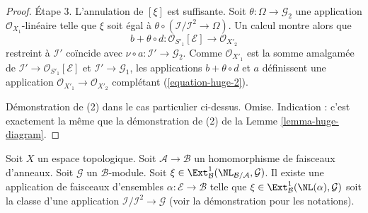 \begin{proof}
\medskip\noindent
Étape 3. L'annulation de $[\xi]$ est suffisante. Soit
$\theta : \Omega \to \mathcal{G}_2$ une application
$\mathcal{O}_{X_1}$-linéaire telle que $\xi$ soit égal à
$\theta \circ (\mathcal{I}/\mathcal{I}^2 \to \Omega)$.
Un calcul montre alors que
$$
b + \theta \circ d : \mathcal{O}_{S'_1}[\mathcal{E}] \to \mathcal{O}_{X'_2}
$$
restreint à $\mathcal{I}'$ coïncide avec
$\nu \circ a : \mathcal{I}' \to \mathcal{G}_2$. Comme
$\mathcal{O}_{X'_1}$ est la somme amalgamée de
$\mathcal{I}' \to \mathcal{O}_{S'_1}[\mathcal{E}]$ et
$\mathcal{I}' \to \mathcal{G}_1$, les applications
$b + \theta \circ d$ et $a$ définissent une application
$\mathcal{O}_{X'_1} \to \mathcal{O}_{X'_2}$ complétant
(\ref{equation-huge-2}).

\medskip\noindent
Démonstration de (2) dans le cas particulier ci-dessus. Omise. Indication :
c'est exactement la même que la démonstration de (2) de la
Lemme \ref{lemma-huge-diagram}.
\end{proof}

\begin{lemma}
\label{lemma-NL-represent-ext-class}
Soit $X$ un espace topologique. Soit $\mathcal{A} \to \mathcal{B}$ un
homomorphisme de faisceaux d'anneaux. Soit $\mathcal{G}$ un
$\mathcal{B}$-module. Soit
$\xi \in \Ext^1_\mathcal{B}(\NL_{\mathcal{B}/\mathcal{A}}, \mathcal{G})$.
Il existe une application de faisceaux d'ensembles
$\alpha : \mathcal{E} \to \mathcal{B}$ telle que
$\xi \in \Ext^1_\mathcal{B}(\NL(\alpha), \mathcal{G})$
soit la classe d'une application
$\mathcal{I}/\mathcal{I}^2 \to \mathcal{G}$
(voir la démonstration pour les notations).
\end{lemma}

